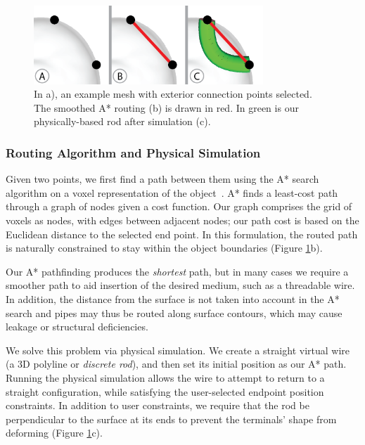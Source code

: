 \begin{figure}[h!]
\centering
    \includegraphics[width=3.4in]{figures/exterior.png}
\caption{In a), an example mesh with exterior connection points selected.  The smoothed A* routing (b) is drawn in {\color{red}red}.  In {\color{tovi}green} is our physically-based rod after simulation (c).}
\label{fig:tool-process-exterior}
\end{figure}

\subsubsection{Routing Algorithm and Physical Simulation}
Given two points, we first find a path between them using the A* search algorithm on a voxel representation of the object~\cite{Hart-Astar}. A* finds a least-cost path through a graph of nodes given a cost function. Our graph comprises the grid of voxels as nodes, with edges between adjacent nodes; our path cost is based on the Euclidean distance to the selected end point. In this formulation, the routed path is naturally constrained to stay within the object boundaries (Figure \ref{fig:tool-process-exterior}b).

Our A* pathfinding produces the \emph{shortest} path, but in many cases
we require a smoother path to aid insertion of the desired medium, such as a threadable wire.
In addition, the distance from the surface is not taken into account in the A* search and pipes may thus be routed along surface contours, which may cause leakage or structural deficiencies.

We solve this problem via physical simulation. We create a straight virtual 
wire (a 3D polyline or \emph{discrete rod}), and then set its initial position 
as our A* path.
Running the physical simulation allows the wire to attempt to return to
a straight configuration, while satisfying the user-selected endpoint position constraints.  In addition to user constraints, we require that the rod be perpendicular to the surface at its ends to prevent the terminals' shape from deforming (Figure \ref{fig:tool-process-exterior}c).

